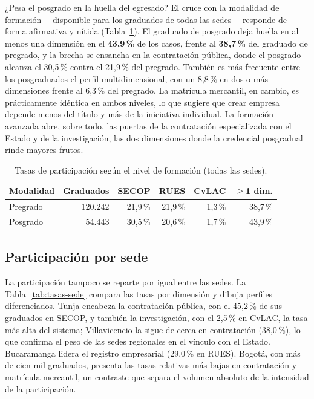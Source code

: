 ¿Pesa el posgrado en la huella del egresado? El cruce con la modalidad de formación ---disponible para los graduados de todas las sedes--- responde de forma afirmativa y nítida (Tabla~\ref{tab:modalidad-participación}). El graduado de posgrado deja huella en al menos una dimensión en el \textbf{43,9\,\%} de los casos, frente al \textbf{38,7\,\%} del graduado de pregrado, y la brecha se ensancha en la contratación pública, donde el posgrado alcanza el 30,5\,\% contra el 21,9\,\% del pregrado. También es más frecuente entre los posgraduados el perfil multidimensional, con un 8,8\,\% en dos o más dimensiones frente al 6,3\,\% del pregrado. La matrícula mercantil, en cambio, es prácticamente idéntica en ambos niveles, lo que sugiere que crear empresa depende menos del título y más de la iniciativa individual. La formación avanzada abre, sobre todo, las puertas de la contratación especializada con el Estado y de la investigación, las dos dimensiones donde la credencial posgradual rinde mayores frutos.

\begin{table}[H]
\centering
\caption{Tasas de participación según el nivel de formación (todas las sedes).}
\label{tab:modalidad-participación}
\begin{tabularx}{0.92\linewidth}{Xrrrrr}
\toprule
\rowcolor{ustaazul}\textbf{\color{white}Modalidad} & \textbf{\color{white}Graduados} & \textbf{\color{white}SECOP} & \textbf{\color{white}RUES} & \textbf{\color{white}CvLAC} & \textbf{\color{white}$\geq$1 dim.} \\
\midrule
Pregrado & 120.242 & 21,9\,\% & 21,9\,\% & 1,3\,\% & 38,7\,\% \\
Posgrado & 54.443 & 30,5\,\% & 20,6\,\% & 1,7\,\% & 43,9\,\% \\
\bottomrule
\end{tabularx}
\end{table}

\subsection{Participación por sede}

La participación tampoco se reparte por igual entre las sedes. La Tabla~\ref{tab:tasas-sede} compara las tasas por dimensión y dibuja perfiles diferenciados. Tunja encabeza la contratación pública, con el 45,2\,\% de sus graduados en SECOP, y también la investigación, con el 2,5\,\% en CvLAC, la tasa más alta del sistema; Villavicencio la sigue de cerca en contratación (38,0\,\%), lo que confirma el peso de las sedes regionales en el vínculo con el Estado. Bucaramanga lidera el registro empresarial (29,0\,\% en RUES). Bogotá, con más de cien mil graduados, presenta las tasas relativas más bajas en contratación y matrícula mercantil, un contraste que separa el volumen absoluto de la intensidad de la participación.

